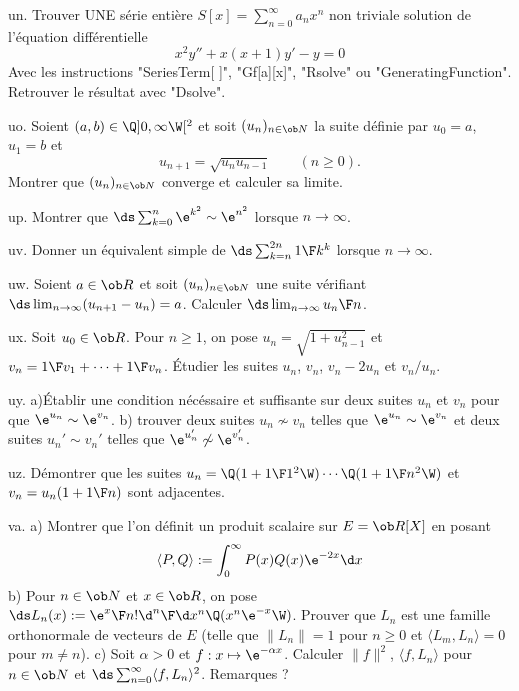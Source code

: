 \exo [Level=2,Fight=2,Learn=2,Field=\EquationsDifférentielles,Type=\Maple,Origin=] un. 
Trouver UNE série entière $S[x]=\sum_{n=0}^\infty a_nx^n$ non triviale
solution de l'équation différentielle 
$$
x^2y''+x(x+1)y'-y=0
$$
Avec les instructions "SeriesTerm[  ]", "Gf[a][x]", "Rsolve" ou "GeneratingFunction". \pn
Retrouver le résultat avec "Dsolve". 

\exo [Level=1,Fight=0,Learn=0,Type=\Exercices,Field=\Suites,Origin=] uo. 
Soient $(a,b)\in\Q]0,\infty\W[^2$ et soit $(u_n)_{n\in\ob N}$ la suite définie par $u_0=a$, $u_1=b$ et 
$$
u_{n+1}=\sqrt{u_nu_{n-1}}\qquad(n\ge0).
$$
Montrer que $(u_n)_{n\in\ob N}$ converge et calculer sa limite. 

\exo [Level=1,Fight=0,Learn=0,Type=\Exercices,Field=\DéveloppementsLimités,Origin=] up. 
Montrer que $\ds\sum_{k=0}^n\e^{k^2}\sim\e^{n^2}$ lorsque $n\to\infty$. 

\exo [Level=1,Fight=0,Learn=0,Type=\Exercices,Field=\DéveloppementsLimités,Origin=] uv. Donner un équivalent simple de $\ds\sum_{k=n}^{2n}{1\F k^k}$ lorsque $n\to\infty$. 
 
\exo [Level=1,Fight=0,Learn=0,Type=\Exercices,Field=\DéveloppementsLimités,Origin=] uw. 
Soient $a\in\ob R$ et soit $(u_n)_{n\in\ob N}$ une suite vérifiant 
$\ds\lim_{n\to\infty}(u_{n+1}-u_n)=a$. Calculer $\ds\lim_{n\to\infty}{u_n\F n}$. 

\exo [Level=2,Fight=0,Learn=0,Type=\Exercices,Field=\SériesNumériques,Origin=] ux. 
Soit $u_0\in\ob R$. Pour $n\ge1$, on pose $u_n=\sqrt{1+u_{n-1}^2}$ 
et $v_n={1\F v_1}+\cdots+{1\F v_n}$. \'Etudier les suites $u_n$, $v_n$, $v_n-2u_n$ et $v_n/u_n$. 

\exo [Level=1,Fight=0,Learn=0,Type=\Exercices,Field=\Suites,Origin=] uy. 
a)\'Etablir une condition nécéssaire et suffisante 
sur deux suites $u_n$ et $v_n$ pour que $\e^{u_n}\sim\e^{v_n}$. 
\pn
b) trouver deux suites $u_n\not\sim v_n$ telles que $\e^{u_n}\sim\e^{v_n}$ et deux suites $u_n'\sim v_n'$ 
telles que $\e^{u_n'}\not\sim\e^{v_n'}$. 

\exo [Level=1,Fight=0,Learn=0,Type=\Exercices,Field=\Suites,Origin=] uz. 
Démontrer que les suites $u_n=\Q(1+{1\F1^2}\W)\cdots\Q(1+{1\F n^2}\W)$ 
et $v_n=u_n(1+{1\F n})$ sont adjacentes. 

\exo [Level=2,Fight=2,Learn=2,Field=\Orthonormalisation,Type=\Colles,Origin=] va. 
a) Montrer que l'on définit un produit scalaire sur $E=\ob R[X]$ en posant 
$$
\langle P,Q\rangle:=\int_0^\infty P(x)Q(x)\e^{-2x}\d x
$$ 
b) Pour $n\in\ob N$ et $x\in\ob R$, on pose $\ds L_n(x):={\e^x\F n!}{\d ^n\F\d x^n}\Q(x^n\e^{-x}\W)$. 
Prouver que $L_n$ est une famille orthonormale de vecteurs de $E$ (telle que $\|L_n\|=1$ pour $n\ge0$ 
et $\langle L_m, L_n\rangle=0$ pour $m\neq n$). \pn
c) Soit $\alpha>0$ et $f:x\mapsto \e^{-\alpha x}$. Calculer $\|f\|^2$, $\langle f,L_n\rangle$ 
pour $n\in\ob N$ et $\ds\sum_{n=0}^\infty\langle f,L_n\rangle^2$. Remarques ?

